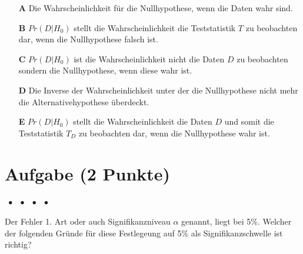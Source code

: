 \documentclass[a4paper, 9pt]{scrartcl}\usepackage[]{graphicx}\usepackage[]{xcolor}
\begin{document}
\begin{enumerate}
\item [\textbf{A} \msquare] Die Wahrscheinlichkeit für die Nullhypothese, wenn die Daten wahr sind.
\item [\textbf{B} \msquare] $Pr(D|H_0)$ stellt die Wahrscheinlichkeit die Teststatistik $T$ zu beobachten dar, wenn die Nullhypothese falsch ist.
\item [\textbf{C} \msquare] $Pr(D|H_0)$ ist die Wahrscheinlichkeit nicht die Daten $D$ zu beobachten sondern die Nullhypothese, wenn diese wahr ist.
\item [\textbf{D} \msquare] Die Inverse der Wahrscheinlichkeit unter der die Nullhypothese nicht mehr die Alternativehypothese überdeckt.
\item [\textbf{E} \msquare] $Pr(D|H_0)$ stellt die Wahrscheinlichkeit die Daten $D$ und somit die Teststatistik $T_D$ zu beobachten dar, wenn die Nullhypothese wahr ist.
\end{enumerate} 

\section{Aufgabe \hfill (2 Punkte)}

\ifcollection
\begin{flushright}
\tiny\vspace{-2Ex}
\textbf{\examinhaltstart}
\exammodulemathstat $\;\bullet$
\exammodulestat $\;\bullet$
\exammodulestatbbv $\;\bullet$
\exammodulestatversuch $\;\bullet$
\exammodulebiostat
\vspace{-1Ex}
\end{flushright}
\fi




Der Fehler 1. Art oder auch Signifikanzniveau $\alpha$ genannt, liegt bei
5\%. Welcher der folgenden Gründe für diese Festlegeung auf 5\% als Signifikanzschwelle ist richtig?
\end{document}
